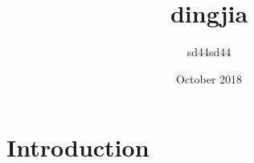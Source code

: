 \documentclass{article}
\title{dingjia}
\author{sd44sd44 }
\date{October 2018}
\begin{document}
\maketitle

\section{Introduction}
\end{document}
